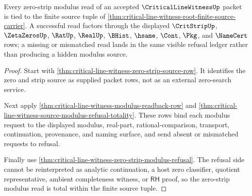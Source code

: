 \begin{theorem}
\label{thm:critical-line-witness-root-zero-strip-modulus-totality}
Every zero-strip modulus read of an accepted $\CriticalLineWitnessUp$ packet is tied to the finite source tuple of \autoref{thm:critical-line-witness-root-finite-source-carrier}. A successful read factors through the displayed $\CritStripUp$, $\ZetaZerosUp$, $\RatUp$, $\RealUp$, $\BHist$, $\hsame$, $\Cont$, $\Pkg$, and $\NameCert$ rows; a missing or mismatched read lands in the same visible refusal ledger rather than producing a hidden modulus source.
\end{theorem}
\begin{proof}
Start with \autoref{thm:critical-line-witness-zero-strip-source-row}. It identifies the zero and strip source as supplied packet rows, not as an external zero-search service.

Next apply \autoref{thm:critical-line-witness-modulus-readback-row} and \autoref{thm:critical-line-witness-source-modulus-refusal-totality}. These rows bind each modulus request to the displayed modulus, real-part, rational-comparison, transport, continuation, provenance, and naming surface, and send absent or mismatched requests to refusal.

Finally use \autoref{thm:critical-line-witness-zero-strip-modulus-refusal}. The refusal side cannot be reinterpreted as analytic continuation, a host zero classifier, quotient representative, ambient completeness witness, or $\mathsf{RH}$ proof, so the zero-strip modulus read is total within the finite source tuple.
\end{proof}

